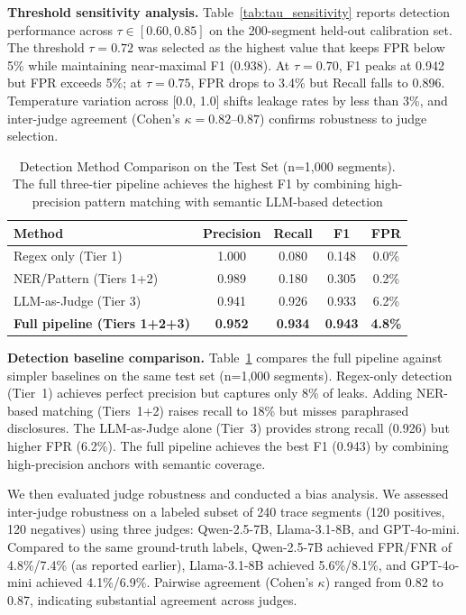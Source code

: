 \documentclass{ieeeaccess}
\begin{document}
\textbf{Threshold sensitivity analysis.} Table~\ref{tab:tau_sensitivity} reports detection performance across $\tau \in [0.60, 0.85]$ on the 200-segment held-out calibration set. The threshold $\tau = 0.72$ was selected as the highest value that keeps FPR below 5\% while maintaining near-maximal F1 (0.938). At $\tau = 0.70$, F1 peaks at 0.942 but FPR exceeds 5\%; at $\tau = 0.75$, FPR drops to 3.4\% but Recall falls to 0.896. Temperature variation across [0.0, 1.0] shifts leakage rates by less than 3\%, and inter-judge agreement (Cohen's $\kappa = 0.82$--$0.87$) confirms robustness to judge selection.



\begin{table}[!t]
\centering
\caption{Detection Method Comparison on the Test Set (n=1,000 segments). The full three-tier pipeline achieves the highest F1 by combining high-precision pattern matching with semantic LLM-based detection}
\label{tab:detection_baselines}
{\footnotesize
\begin{tabular}{@{}lcccc@{}}
\toprule
\textbf{Method} & \textbf{Precision} & \textbf{Recall} & \textbf{F1} & \textbf{FPR} \\
\midrule
Regex only (Tier 1) & 1.000 & 0.080 & 0.148 & 0.0\% \\
NER/Pattern (Tiers 1+2) & 0.989 & 0.180 & 0.305 & 0.2\% \\
LLM-as-Judge (Tier 3) & 0.941 & 0.926 & 0.933 & 6.2\% \\
\textbf{Full pipeline (Tiers 1+2+3)} & \textbf{0.952} & \textbf{0.934} & \textbf{0.943} & \textbf{4.8\%} \\
\bottomrule
\end{tabular}}
\end{table}


\textbf{Detection baseline comparison.} Table~\ref{tab:detection_baselines} compares the full pipeline against simpler baselines on the same test set (n=1,000 segments). Regex-only detection (Tier~1) achieves perfect precision but captures only 8\% of leaks. Adding NER-based matching (Tiers~1+2) raises recall to 18\% but misses paraphrased disclosures. The LLM-as-Judge alone (Tier~3) provides strong recall (0.926) but higher FPR (6.2\%). The full pipeline achieves the best F1 (0.943) by combining high-precision anchors with semantic coverage.



We then evaluated judge robustness and conducted a bias analysis. We assessed inter-judge robustness on a labeled subset of 240 trace segments (120 positives, 120 negatives) using three judges: Qwen-2.5-7B, Llama-3.1-8B, and GPT-4o-mini. Compared to the same ground-truth labels, Qwen-2.5-7B achieved FPR/FNR of 4.8\%/7.4\% (as reported earlier), Llama-3.1-8B achieved 5.6\%/8.1\%, and GPT-4o-mini achieved 4.1\%/6.9\%. Pairwise agreement (Cohen's $\kappa$) ranged from 0.82 to 0.87, indicating substantial agreement across judges.
\end{document}
